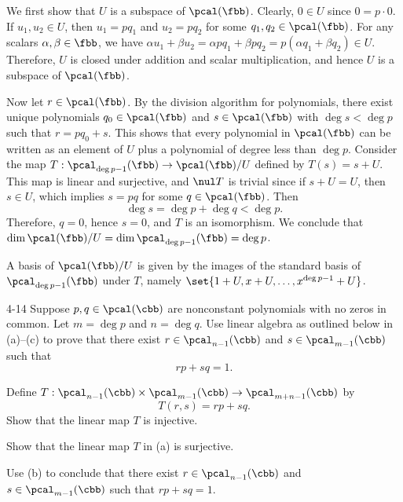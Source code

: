 \begin{solenum}
    \item We first show that $U$ is a subspace of $\pcal(\fbb)$.
	Clearly, $0 \in U$ since $0 = p \cdot 0$.
	If $u_1, u_2 \in U$, then $u_1 = pq_1$ and $u_2 = pq_2$ for some $q_1, q_2 \in \pcal(\fbb)$.
	For any scalars $\alpha, \beta \in \fbb$, we have $\alpha u_1 + \beta u_2 = \alpha pq_1 + \beta pq_2 = p(\alpha q_1 + \beta q_2) \in U$.
	Therefore, $U$ is closed under addition and scalar multiplication, and hence $U$ is a subspace of $\pcal(\fbb)$.
    
    Now let $r \in \pcal(\fbb)$.
	By the division algorithm for polynomials, there exist unique polynomials $q_0 \in \pcal(\fbb)$ and $s \in \pcal(\fbb)$ with $\deg s < \deg p$ such that $r = pq_0 + s$.
	This shows that every polynomial in $\pcal(\fbb)$ can be written as an element of $U$ plus a polynomial of degree less than $\deg p$.
	Consider the map $T : \pcal_{\deg p - 1}(\fbb) \to \pcal(\fbb) / U$ defined by $T(s) = s + U$.
	This map is linear and surjective, and $\nul T$ is trivial since if $s + U = U$, then $s \in U$, which implies $s = pq$ for some $q \in \pcal(\fbb)$.
	Then
    \[
    	\deg s = \deg p + \deg q < \deg p.
    \]
	Therefore, $q = 0$, hence $s = 0$, and $T$ is an isomorphism.
    We conclude that $\dim \pcal(\fbb) / U = \dim \pcal_{\deg p - 1}(\fbb) = \deg p$.
    \item A basis of $\pcal(\fbb) / U$ is given by the images of the standard basis of $\pcal_{\deg p - 1}(\fbb)$ under $T$, namely $\set{1 + U, x + U, \ldots, x^{\deg p - 1} + U}$.
\end{solenum}

\begin{exercise}{4-14}
    Suppose $p, q \in \pcal(\cbb)$ are nonconstant polynomials with no zeros in common.
	Let $m = \deg p$ and $n = \deg q$.
	Use linear algebra as outlined below in (a)--(c) to prove that there exist $r \in \pcal_{n-1}(\cbb)$ and $s \in \pcal_{m-1}(\cbb)$ such that
    \[
    	rp + sq = 1.
    \]
    \begin{subexercises}
        \item Define $T: \pcal_{n-1}(\cbb) \times \pcal_{m-1}(\cbb) \to \pcal_{m+n-1}(\cbb)$ by
        \[
        	T(r, s) = rp + sq.
        \]
        Show that the linear map $T$ is injective.
        \item Show that the linear map $T$ in (a) is surjective.
        \item Use (b) to conclude that there exist $r \in \pcal_{n-1}(\cbb)$ and $s \in \pcal_{m-1}(\cbb)$ such that $rp + sq = 1$.
    \end{subexercises}
\end{exercise}

